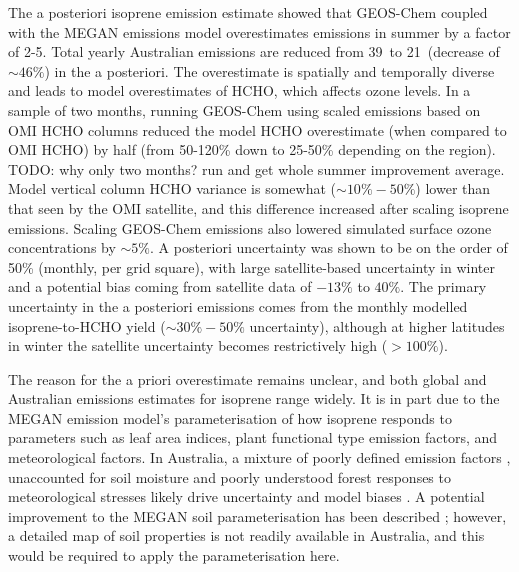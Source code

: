   The a posteriori isoprene emission estimate showed that GEOS-Chem coupled with the MEGAN emissions model overestimates emissions in summer by a factor of 2-5.
  Total yearly Australian emissions are reduced from 39\tgpyr ~to 21\tgpyr ~(decrease of $\sim{46}\%$) in the a posteriori.
  The overestimate is spatially and temporally diverse and leads to model overestimates of HCHO, which affects ozone levels.
  In a sample of two months, running GEOS-Chem using scaled emissions based on OMI HCHO columns reduced the model HCHO overestimate (when compared to OMI HCHO) by half (from 50-120\% down to 25-50\% depending on the region).
  TODO: why only two months? run and get whole summer improvement average.
  Model vertical column HCHO variance is somewhat ($\sim{10\%-50\%}$) lower than that seen by the OMI satellite, and this difference increased after scaling isoprene emissions.
  Scaling GEOS-Chem emissions also lowered simulated surface ozone concentrations by $\sim 5\%$.
  A posteriori uncertainty was shown to be on the order of 50\%  (monthly, per grid square), with large satellite-based uncertainty in winter and a potential bias coming from satellite data of $-13\%$ to $40\%$.
  The primary uncertainty in the a posteriori emissions comes from the monthly modelled isoprene-to-HCHO yield ($\sim 30\%-50\%$ uncertainty), although at higher latitudes in winter the satellite uncertainty becomes restrictively high ($>100\%$).
  
  
  
  The reason for the a priori overestimate remains unclear, and both global and Australian emissions estimates for isoprene range widely.
  It is in part due to the MEGAN emission model's parameterisation of how isoprene responds to parameters such as leaf area indices, plant functional type emission factors, and meteorological factors. 
  In Australia, a mixture of poorly defined emission factors \parencite[e.g.,][]{Emmerson2016}, unaccounted for soil moisture \parencite[e.g.,][]{Sindelarova2014, Emmerson2019} and poorly understood forest responses to meteorological stresses likely drive uncertainty and model biases \parencite{Jiang2018,Emmerson2019}.
  A potential improvement to the MEGAN soil parameterisation has been described \parencite{Jiang2018}; however, a detailed map of soil properties is not readily available in Australia, and this would be required to apply the parameterisation here.
  
